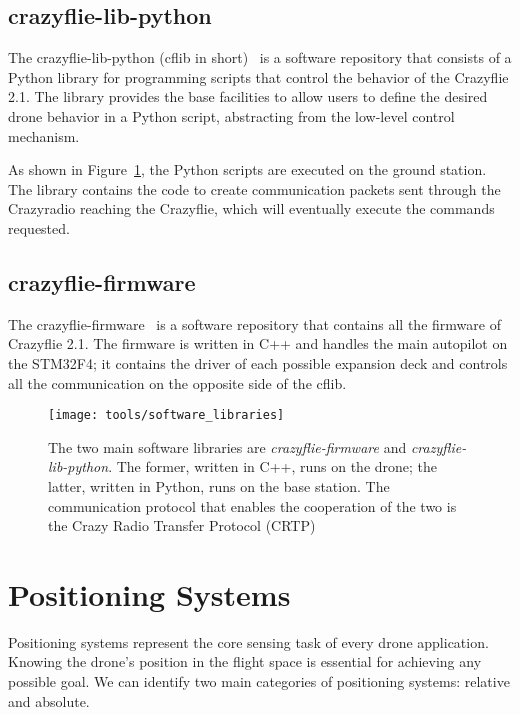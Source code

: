 \subsection{crazyflie-lib-python}\label{subsec:crazyflie_lib_python}
The crazyflie-lib-python (cflib in short)~\cite{crazyflie-lib-python} is a software repository that consists of a Python library for programming scripts that control the behavior of the Crazyflie 2.1.
The library provides the base facilities to allow users to define the desired drone behavior in a Python script, abstracting from the low-level control mechanism.

As shown in Figure~\ref{fig:software_libraries}, the Python scripts are executed on the ground station.
The library contains the code to create communication packets sent through the Crazyradio reaching the Crazyflie, which will eventually execute the commands requested. 

\subsection{crazyflie-firmware}\label{subsec:crazyflie-firmware}
The crazyflie-firmware~\cite{crazyflie-firmware} is a software repository that contains all the firmware of Crazyflie 2.1. 
The firmware is written in C++ and handles the main autopilot on the STM32F4; it contains the driver of each possible expansion deck and controls all the communication on the opposite side of the cflib.


\begin{figure}[tb]
    \centering
    \texttt{[image: tools/software\_libraries]}
    \caption[Software libraries integration]{
        The two main software libraries are \textit{crazyflie-firmware} and \textit{crazyflie-lib-python}. 
        The former, written in C++, runs on the drone; the latter, written in Python, runs on the base station. 
        The communication protocol that enables the cooperation of the two is the Crazy Radio Transfer Protocol (CRTP)}\label{fig:software_libraries}
\end{figure}


\section{Positioning Systems}\label{sec:positioning_systems}
Positioning systems represent the core sensing task of every drone application. 
Knowing the drone's position in the flight space is essential for achieving any possible goal.
We can identify two main categories of positioning systems: relative and absolute. 

